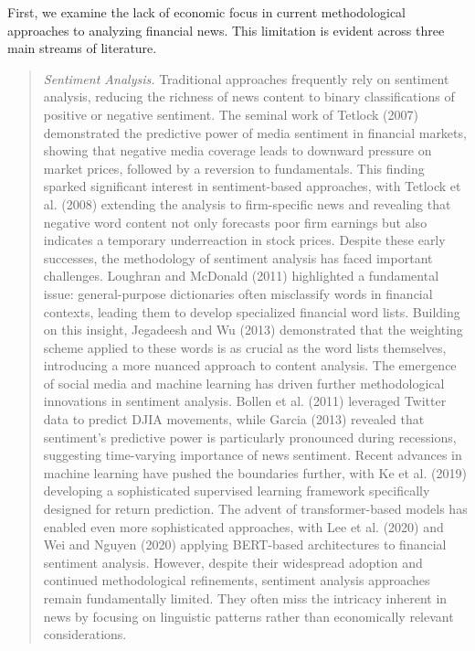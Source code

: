 \mx 
First, we examine the lack of economic focus in current methodological approaches to analyzing financial news. This limitation is evident across three main streams of literature.
\begin{quote}
\hspace{0.5cm} \textit{Sentiment Analysis.} 
Traditional approaches frequently rely on sentiment analysis, reducing the richness of news content to binary classifications of positive or negative sentiment. The seminal work of Tetlock (2007) demonstrated the predictive power of media sentiment in financial markets, showing that negative media coverage leads to downward pressure on market prices, followed by a reversion to fundamentals. This finding sparked significant interest in sentiment-based approaches, with Tetlock et al. (2008) extending the analysis to firm-specific news and revealing that negative word content not only forecasts poor firm earnings but also indicates a temporary underreaction in stock prices.
Despite these early successes, the methodology of sentiment analysis has faced important challenges. 
Loughran and McDonald (2011) highlighted a fundamental issue: general-purpose dictionaries often misclassify words in financial contexts, leading them to develop specialized financial word lists. Building on this insight, Jegadeesh and Wu (2013) demonstrated that the weighting scheme applied to these words is as crucial as the word lists themselves, introducing a more nuanced approach to content analysis.
The emergence of social media and machine learning has driven further methodological innovations in sentiment analysis. Bollen et al. (2011) leveraged Twitter data to predict DJIA movements, while Garcia (2013) revealed that sentiment's predictive power is particularly pronounced during recessions, suggesting time-varying importance of news sentiment. Recent advances in machine learning have pushed the boundaries further, with Ke et al. (2019) developing a sophisticated supervised learning framework specifically designed for return prediction. The advent of transformer-based models has enabled even more sophisticated approaches, with Lee et al. (2020) and Wei and Nguyen (2020) applying BERT-based architectures to financial sentiment analysis.
%
However, despite their widespread adoption and continued methodological refinements, sentiment analysis approaches remain fundamentally limited. They often miss the intricacy inherent in news by focusing on linguistic patterns rather than economically relevant considerations. 


\end{quote}
